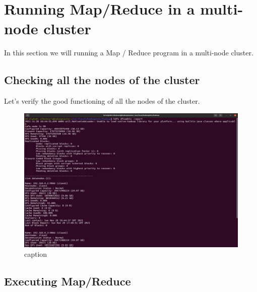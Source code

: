 \chapter{Running Map/Reduce in a multi-node cluster}
\par In this section we will running a Map / Reduce program in a multi-node cluster.
\begin{spacing}{1.2}
\section{Checking all the nodes of the cluster}

\par Let's verify the good functioning of all the nodes of the cluster.
\\
\begin{figure}[!htb] 
\begin{center} 
\includegraphics[width=1\linewidth]{Big_Data/Hadoop/Multi-Nodes Map_Reduce/Verifying cluster nodes.jpg} 
\end{center} 
\caption{caption} 
\end{figure} 
\FloatBarrier



\section{Executing Map/Reduce}


\end{spacing}
